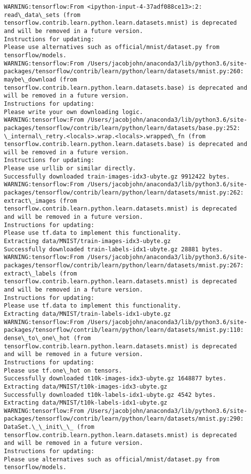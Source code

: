 \documentclass[11pt]{article}
\begin{document}
    \begin{Verbatim}[commandchars=\\\{\}]
WARNING:tensorflow:From <ipython-input-4-37adf088ce13>:2: read\_data\_sets (from tensorflow.contrib.learn.python.learn.datasets.mnist) is deprecated and will be removed in a future version.
Instructions for updating:
Please use alternatives such as official/mnist/dataset.py from tensorflow/models.
WARNING:tensorflow:From /Users/jacobjohn/anaconda3/lib/python3.6/site-packages/tensorflow/contrib/learn/python/learn/datasets/mnist.py:260: maybe\_download (from tensorflow.contrib.learn.python.learn.datasets.base) is deprecated and will be removed in a future version.
Instructions for updating:
Please write your own downloading logic.
WARNING:tensorflow:From /Users/jacobjohn/anaconda3/lib/python3.6/site-packages/tensorflow/contrib/learn/python/learn/datasets/base.py:252: \_internal\_retry.<locals>.wrap.<locals>.wrapped\_fn (from tensorflow.contrib.learn.python.learn.datasets.base) is deprecated and will be removed in a future version.
Instructions for updating:
Please use urllib or similar directly.
Successfully downloaded train-images-idx3-ubyte.gz 9912422 bytes.
WARNING:tensorflow:From /Users/jacobjohn/anaconda3/lib/python3.6/site-packages/tensorflow/contrib/learn/python/learn/datasets/mnist.py:262: extract\_images (from tensorflow.contrib.learn.python.learn.datasets.mnist) is deprecated and will be removed in a future version.
Instructions for updating:
Please use tf.data to implement this functionality.
Extracting data/MNIST/train-images-idx3-ubyte.gz
Successfully downloaded train-labels-idx1-ubyte.gz 28881 bytes.
WARNING:tensorflow:From /Users/jacobjohn/anaconda3/lib/python3.6/site-packages/tensorflow/contrib/learn/python/learn/datasets/mnist.py:267: extract\_labels (from tensorflow.contrib.learn.python.learn.datasets.mnist) is deprecated and will be removed in a future version.
Instructions for updating:
Please use tf.data to implement this functionality.
Extracting data/MNIST/train-labels-idx1-ubyte.gz
WARNING:tensorflow:From /Users/jacobjohn/anaconda3/lib/python3.6/site-packages/tensorflow/contrib/learn/python/learn/datasets/mnist.py:110: dense\_to\_one\_hot (from tensorflow.contrib.learn.python.learn.datasets.mnist) is deprecated and will be removed in a future version.
Instructions for updating:
Please use tf.one\_hot on tensors.
Successfully downloaded t10k-images-idx3-ubyte.gz 1648877 bytes.
Extracting data/MNIST/t10k-images-idx3-ubyte.gz
Successfully downloaded t10k-labels-idx1-ubyte.gz 4542 bytes.
Extracting data/MNIST/t10k-labels-idx1-ubyte.gz
WARNING:tensorflow:From /Users/jacobjohn/anaconda3/lib/python3.6/site-packages/tensorflow/contrib/learn/python/learn/datasets/mnist.py:290: DataSet.\_\_init\_\_ (from tensorflow.contrib.learn.python.learn.datasets.mnist) is deprecated and will be removed in a future version.
Instructions for updating:
Please use alternatives such as official/mnist/dataset.py from tensorflow/models.

    \end{Verbatim}
\end{document}
